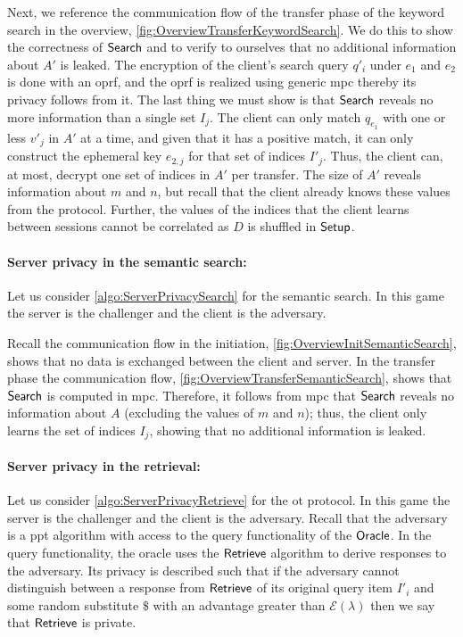  Next, we reference the communication flow of the transfer phase of the keyword search in the overview, \cref{fig:OverviewTransferKeywordSearch}. We do this to show the correctness of $ \mathsf{{Search}} $ and to verify to ourselves that no additional information about $ A' $ is leaked. The encryption of the client's search query $ q'_i $ under $ e_1 $ and $ e_2 $ is done with an \acrshort{oprf}, and the \acrshort{oprf} is realized using generic \acrshort{mpc} thereby its privacy follows from it. The last thing we must show is that $ \mathsf{{Search}} $ reveals no more information than a single set $ I_j $. The client can only match $ q_{e_1} $ with one or less $ v'_j $ in $ A' $ at a time, and given that it has a positive match, it can only construct the ephemeral key $ e_{2, j} $ for that set of indices $ I'_j $. Thus, the client can, at most, decrypt one set of indices in $ A' $ per transfer. The size of $ A' $ reveals information about $ m $ and $ n $, but recall that the client already knows these values from the protocol. Further, the values of the indices that the client learns between sessions cannot be correlated as $ D $ is shuffled in $ \mathsf{{Setup}} $.

\paragraph*{Server privacy in the semantic search:} Let us consider \cref{algo:ServerPrivacySearch} for the semantic search.  In this game the server is the challenger and the client is the adversary.

Recall the communication flow in the initiation, \cref{fig:OverviewInitSemanticSearch}, shows that no data is exchanged between the client and server. In the transfer phase the communication flow, \cref{fig:OverviewTransferSemanticSearch}, shows that $ \mathsf{{Search}} $ is computed in \acrshort{mpc}. Therefore, it follows from \acrshort{mpc} that $ \mathsf{{Search}} $ reveals no information about $ A $ (excluding the values of $ m $ and $ n $); thus, the client only learns the set of indices $ I_j $, showing that no additional information is leaked.

\paragraph*{Server privacy in the retrieval:} Let us consider \cref{algo:ServerPrivacyRetrieve} for the \acrshort{ot} protocol. In this game the server is the challenger and the client is the adversary. Recall that the adversary is a \acrshort{ppt} algorithm with access to the query functionality of the $ \mathsf{{Oracle}} $. In the query functionality, the oracle uses the $ \mathsf{{Retrieve}} $ algorithm to derive responses to the adversary. Its privacy is described such that if the adversary cannot distinguish between a response from $ \mathsf{{Retrieve}} $ of its original query item $ I'_i $ and some random substitute $ \$ $ with an advantage greater than $ \mathcal{E} \left( \lambda \right) $ then we say that $ \mathsf{{Retrieve}} $ is private.

